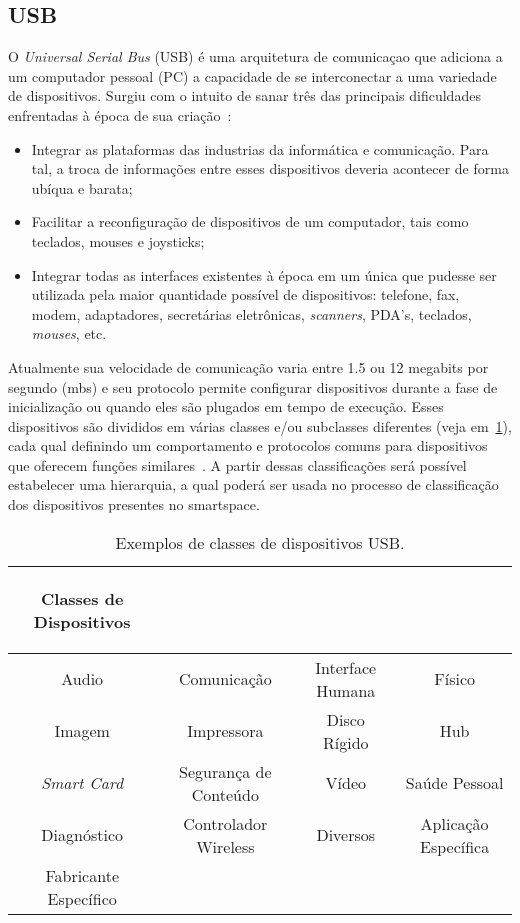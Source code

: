 \subsection{USB}

O \emph{Universal Serial Bus} (USB) é uma arquitetura de comunicaçao que adiciona a um computador pessoal (PC) a capacidade de se interconectar a uma variedade de dispositivos. Surgiu com o intuito de sanar três das principais dificuldades enfrentadas à época de sua criação~\cite{usbspec}:

\begin{itemize}
	\item Integrar as plataformas das industrias da informática e comunicação. Para tal, a troca de informações entre esses dispositivos deveria acontecer de forma ubíqua e barata;
	\item Facilitar a reconfiguração de dispositivos de um computador, tais como teclados, mouses e joysticks;
	\item Integrar todas as interfaces existentes à época em um única que pudesse ser utilizada pela maior quantidade possível de dispositivos: telefone, fax, modem, adaptadores, secretárias eletrônicas, \emph{scanners}, PDA's, teclados, \emph{mouses}, etc.
\end{itemize}

Atualmente sua velocidade de comunicação varia entre 1.5 ou 12 megabits por segundo (mbs) e seu protocolo permite configurar dispositivos durante a fase de inicialização ou quando eles são plugados em tempo de execução. Esses dispositivos são divididos em várias classes e/ou subclasses diferentes (veja em~\ref{tab:dispositivos_usb}), cada qual definindo um comportamento e protocolos comuns para dispositivos que oferecem funções similares~\cite{hid}. A partir dessas classificações será possível estabelecer uma hierarquia, a qual poderá ser usada no processo de classificação dos dispositivos presentes no smartspace.

\begin{table}
	\begin{center}
		\begin{tabular}{cccc}
		\hline
		\begin{center}\textbf{Classes de Dispositivos}\end{center}												\\
		\hline
		Audio					&	Comunicação				&	Interface Humana	&	Físico 					\\
		\hline
		Imagem					&	Impressora				&	Disco Rígido		&	Hub 					\\
		\hline
		\emph{Smart Card}		&	Segurança de Conteúdo	&	Vídeo				&	Saúde Pessoal 			\\
		\hline
		Diagnóstico				& Controlador Wireless		&	Diversos			&	Aplicação Específica	\\
		\hline
		Fabricante Específico	&							&						&							\\
		\hline
		\end{tabular}
	\end{center}
	\caption{Exemplos de classes de dispositivos USB.}
	\label{tab:dispositivos_usb}
\end{table}

